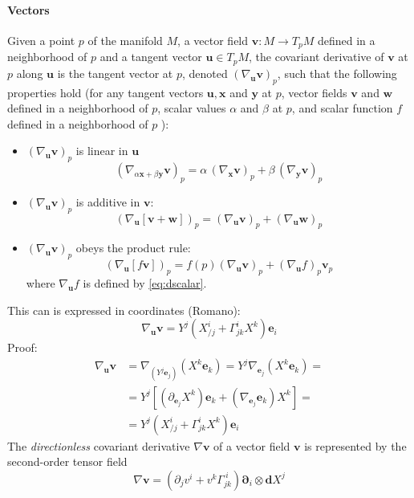 \paragraph{Vectors}
Given a point $p$ of the manifold $M$, a vector field $\bm{v}: M \rightarrow T_p M$ defined in a neighborhood of $p$ and a tangent vector $\bm{u} \in T_p M$, the covariant derivative of $\bm{v}$ at $p$ along $\bm{u}$ is the tangent vector at $p$, denoted $\left(\nabla_{\bm{u}} \bm{v}\right)_p$, such that the following properties hold (for any tangent vectors $\bm{u}, \bm{x}$ and $\bm{y}$ at $p$, vector fields $\bm{v}$ and $\bm{w}$ defined in a neighborhood of $p$, scalar values $\alpha$ and $\beta$ at $p$, and scalar function $f$ defined in a neighborhood of $p$ ):
\begin{itemize}
\item $\left(\nabla_{\bm{u}} \bm{v}\right)_p$ is linear in $\bm{u}$
$$
\left(\nabla_{\alpha \bm{x} + \beta \bm{y}} \bm{v}\right)_p
= \alpha\, \left(\nabla_{\bm{x}} \bm{v}\right)_p+\beta\, \left(\nabla_{\bm{y}} \bm{v}\right)_p
$$
\item $\left(\nabla_{\bm{u}} \bm{v}\right)_p$ is additive in $\bm{v}$:
$$
\left(\nabla_{\bm{u}}[\bm{v}+\bm{w}]\right)_p=\left(\nabla_{\bm{u}} \bm{v}\right)_p+\left(\nabla_{\bm{u}} \bm{w}\right)_p
$$
\item $\left(\nabla_{\bm{u}} \bm{v}\right)_p$ obeys the product rule:
$$
\left(\nabla_{\bm{u}}[f \bm{v}]\right)_p=f(p)\left(\nabla_{\bm{u}} \bm{v}\right)_p+\left(\nabla_{\bm{u}} f\right)_p \bm{v}_p
$$
where $\nabla_{\bm{u}} f$ is defined by \eqref{eq:dscalar}.
\end{itemize}

This can is expressed in coordinates (Romano):
$$
\nabla_{\bm{u}} \bm{v}=Y^j\left(X_{/ j}^i+\Gamma_{j k}^i X^k\right) \mathbf{e}_i
$$
Proof:
$$
\begin{aligned}
\nabla_{\bm{u}} \bm{v} & =\nabla_{\left(Y^j \mathbf{e}_j\right)}\left(X^k \mathbf{e}_k\right)=Y^j \nabla_{\mathbf{e}_j}\left(X^k \mathbf{e}_k\right)= \\
& =Y^j\left[\left(\partial_{\mathbf{e}_j} X^k\right) \mathbf{e}_k+\left(\nabla_{\mathbf{e}_j} \mathbf{e}_k\right) X^k\right]= \\
& =Y^j\left(X_{/ j}^i+\Gamma_{j k}^i X^k\right) \mathbf{e}_i
\end{aligned}
$$
%
The \emph{directionless} covariant derivative $\nabla \bm{v}$ of a vector field $\bm{v}$ is represented by the second-order tensor field
$$
\nabla \bm{v}=\left(\partial_j v^i+v^k \Gamma_{j k}^{~ i}\right) \bm{\partial}_i \otimes \bm{d} X^j
$$


